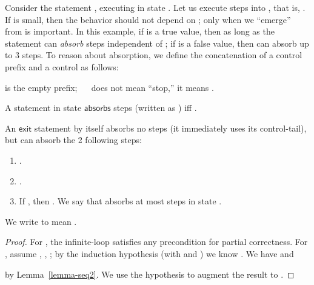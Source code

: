 \documentclass{llncs}
\newcommand{\tyface}[1]{\ensuremath{\mathsf{#1}}}
\begin{document}
Consider the statement , executing in state .
Let us execute  steps into , that is, 
.
If  is small, then the behavior should not depend on ;
only when we ``emerge'' from  is  important.
In this example,
if  is a true value, then as long as  the
statement  can \emph{absorb}  steps independent of ;
if  is a false value, then  can absorb up to 3 steps.
To reason about absorption, we define the
concatenation  
of a control prefix  and a control  as follows:
\vspace{-7pt}

 is the empty prefix; 
~~ does not mean ``stop,'' it means .

\begin{definition}[absorption]
A statement  in state  \tyface{absorbs}  steps (written as  ) iff 
.
\end{definition}

\begin{example}
An \tyface{exit} statement by itself absorbs no steps (it immediately
uses its control-tail), but
 can absorb the 2 following steps:\newline

\end{example}

\begin{lemma}
\begin{enumerate}
\item .
\item .
\item If , then 
.
We say that  absorbs at most  steps in state .
\end{enumerate}
\end{lemma}



\begin{definition}
We write  to mean
.
\end{definition}
\vspace{-8pt}
\vspace{-7pt}
\begin{lemma}
\label{semax_loop2}

\begin{proof}
For , the infinite-loop  satisfies any precondition for
partial correctness.
For , 
assume , 
, 
;
by the induction hypothesis (with  and )
we know .
We have 
 and

by Lemma~\ref{lemma-seq2}.
We use the hypothesis  to augment the result to
. 

\end{proof}
\end{lemma}
\end{document}
